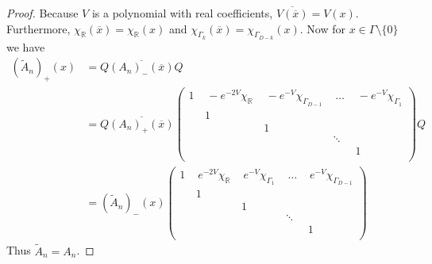 \documentclass[12pt]{article}
\theoremstyle{definition}
\begin{document}
\begin{proof}
Because $V$ is a polynomial with real coefficients, $\overline{V(\overline{x})} = V(x)$. Furthermore, $\chi_\mathbb{R}(\overline{x}) = \chi_\mathbb{R}(x)$ and $\chi_{\Gamma_k}(\overline{x}) = \chi_{\Gamma_{D-k}}(x)$.  Now for $x \in \Gamma \setminus \{ 0 \}$ we have
\begin{align*}
\left(\tilde{A}_{n} \right)_+(x) &= Q \overline{\left( A_{n}\right)_- (\overline{x})}  Q \\
&= Q \overline{\left( A_{n}\right)_+ (\overline{x})} \left(\begin{array}{ccccccccccccccccccc}
1 \,  & \, -e^{-2V} \chi_\mathbb{R} \,  & \,  -e^{-V} \chi_{\Gamma_{D-1}} \,   & \,  \dots \,  & \,  -e^{-V} \chi_{\Gamma_{1}}   \\
& 1 \\
& & 1 \\
& & & \ddots \\
& & & & 1 \\
\end{array} \right)  Q \\
&=\left(\tilde{A}_{n} \right)_-(x)\left(\begin{array}{ccccccccccccccccccc}
1 \,  & \, e^{-2V} \chi_\mathbb{R} \,  & \,  e^{-V} \chi_{\Gamma_{1}} \,   & \,  \dots \,  & \,  e^{-V} \chi_{\Gamma_{D-1}}   \\
& 1 \\
& & 1 \\
& & & \ddots \\
& & & & 1 \\
\end{array} \right)
\end{align*}
Thus $\tilde{A}_{n} = A_{n}$.
\end{proof}
\end{document}
